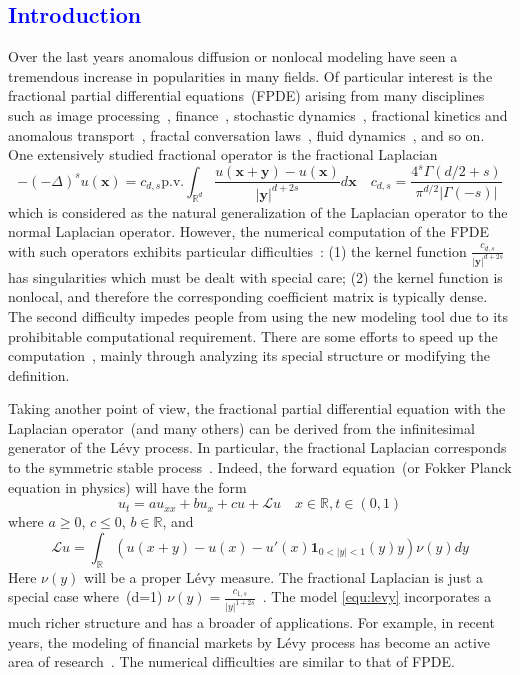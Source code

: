 \documentclass[3p,,preprint,12pt]{elsarticle}
\newcommand{\RR}[0]{\mathbb{R}}
\newcommand{\bx}[0]{\mathbf{x}}
\newcommand{\lib}[1]{\textcolor{blue}{\section{#1}}}
\theoremstyle{definition}
\newcommand{\by}[0]{\mathbf{y}}
\begin{document}
\lib{Introduction}
Over the last years anomalous diffusion or nonlocal modeling have seen a tremendous increase in popularities in many fields. Of particular interest is the fractional partial differential equations~(FPDE) arising from many disciplines such as image processing~\cite{gatto2015numerical,unser2009multiresolution}, finance~\cite{scalas2000fractional}, stochastic dynamics~\cite{bogdan2003censored}, fractional kinetics and anomalous transport~\cite{zaslavsky2002chaos}, fractal conversation laws~\cite{alibaud2012continuous}, fluid dynamics~\cite{chen2010anomalous,chen2006speculative,epps2018turbulence}, and so on. One extensively studied fractional operator is the fractional Laplacian~\cite{lischke2018fractional}
\begin{equation}
	-(-\Delta)^s u(\bx)=c_{d,s}\mathrm{p.v.}\int_{\RR^d} \frac{u(\bx+\by)-u(\bx)}{|\by|^{d+2s}}d\bx\quad c_{d,s} = \frac{4^s\Gamma(d/2+s)}{\pi^{d/2}|\Gamma(-s) |}
\end{equation}
which is considered as the natural generalization of the Laplacian operator to the normal Laplacian operator. However, the numerical computation of the FPDE with such operators exhibits particular difficulties~\cite{bonito2018numerical,huang2016finite}: (1) the kernel function $\frac{c_{d,s}}{|\by|^{d+2s}}$ has singularities which must be dealt with special care; (2) the kernel function is nonlocal, and therefore the corresponding coefficient matrix is typically dense. The second difficulty impedes people from using the new modeling tool due to its prohibitable computational requirement. There are some efforts to speed up the computation~\cite{meidner2017hp,kyprianou2017unbiased,acosta2018regularity,zhao2017adaptive}, mainly through analyzing its special structure or modifying the definition. 

Taking another point of view, the fractional partial differential equation with the Laplacian operator~(and many others) can be derived from the infinitesimal generator of the L\'evy process. In particular, the fractional Laplacian corresponds to the symmetric stable process~\cite{garbaczewski2018fractional}. Indeed, the forward equation~(or Fokker Planck equation in physics) will have the form~\cite{barndorff2012levy}
\begin{equation}\label{equ:levy}
	u_t = a u_{xx} + bu_x + cu + \mathcal{L}u\quad x\in \RR, t\in (0,1)
\end{equation}
where $a\geq 0$, $c\leq 0$, $b\in\RR$, and
\begin{equation}
	\mathcal{L}u = \int_\RR (u(x+y)-u(x)-u'(x)\mathbf{1}_{0<|y|<1}(y)y)\nu(y)dy
\end{equation}  
Here $\nu(y)$ will be a proper L\'evy measure. The fractional Laplacian is just a special case where~(d=1) $\nu(y) = \frac{c_{1,s}}{|y|^{1+2s}}$~\cite{kwasnicki2017ten}. The model \cref{equ:levy} incorporates a much richer structure and has a broader of applications. For example, in recent years, the modeling of financial markets by L\'evy process has become an active area of research~\cite{MichaelC25:online}. The numerical difficulties are similar to that of FPDE. 
\end{document}

